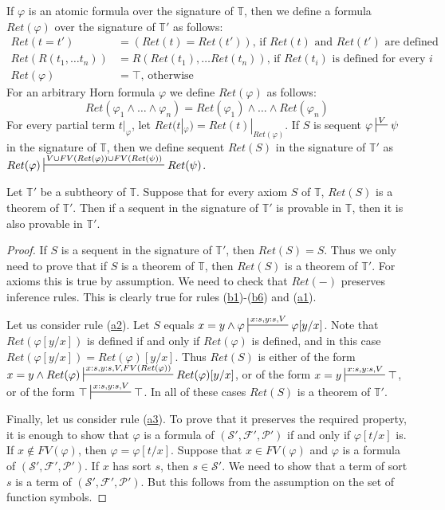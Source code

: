 \documentclass[reqno]{amsart}
\newcommand{\axref}[1]{(\hyperref[ax:#1]{#1})}
\theoremstyle{definition}
\theoremstyle{remark}
\numberwithin{figure}{section}
\begin{document}
If $\varphi$ is an atomic formula over the signature of $\mathbb{T}$, then we define a formula $Ret(\varphi)$ over the signature of $\mathbb{T}'$ as follows:
\begin{align*}
Ret(t = t') & = (Ret(t) = Ret(t')) \text{, if $Ret(t)$ and $Ret(t')$ are defined} \\
Ret(R(t_1, \ldots t_n)) & = R(Ret(t_1), \ldots Ret(t_n)) \text{, if $Ret(t_i)$ is defined for every $i$} \\
Ret(\varphi) & = \top \text{, otherwise}
\end{align*}
For an arbitrary Horn formula $\varphi$ we define $Ret(\varphi)$ as follows:
\[ Ret(\varphi_1 \land \ldots \land \varphi_n) = Ret(\varphi_1) \land \ldots \land Ret(\varphi_n) \]
For every partial term $t|_\varphi$, let $Ret(t|_\varphi) = Ret(t)|_{Ret(\varphi)}$.
If $S$ is sequent $\varphi \sststile{}{V} \psi$ in the signature of $\mathbb{T}$,
    then we define sequent $Ret(S)$ in the signature of $\mathbb{T}'$ as $Ret(\varphi) \sststile{}{V \cup FV(Ret(\varphi)) \cup FV(Ret(\psi))} Ret(\psi)$.

\begin{lem}[subtheory]
Let $\mathbb{T}'$ be a subtheory of $\mathbb{T}$.
Suppose that for every axiom $S$ of $\mathbb{T}$, $Ret(S)$ is a theorem of $\mathbb{T}'$.
Then if a sequent in the signature of $\mathbb{T}'$ is provable in $\mathbb{T}$, then it is also provable in $\mathbb{T}'$.
\end{lem}
\begin{proof}
If $S$ is a sequent in the signature of $\mathbb{T}'$, then $Ret(S) = S$.
Thus we only need to prove that if $S$ is a theorem of $\mathbb{T}$, then $Ret(S)$ is a theorem of $\mathbb{T}'$.
For axioms this is true by assumption.
We need to check that $Ret(-)$ preserves inference rules.
This is clearly true for rules \axref{b1}-\axref{b6} and \axref{a1}.

Let us consider rule \axref{a2}.
Let $S$ equals $x = y \land \varphi \sststile{}{x:s,y:s,V} \varphi[y/x]$.
Note that $Ret(\varphi[y/x])$ is defined if and only if $Ret(\varphi)$ is defined, and in this case $Ret(\varphi[y/x]) = Ret(\varphi)[y/x]$.
Thus $Ret(S)$ is either of the form $x = y \land Ret(\varphi) \sststile{}{x:s,y:s,V,FV(Ret(\varphi))} Ret(\varphi)[y/x]$,
or of the form $x = y \sststile{}{x:s,y:s,V} \top$, or of the form $\top \sststile{}{x:s,y:s,V} \top$.
In all of these cases $Ret(S)$ is a theorem of $\mathbb{T}'$.

Finally, let us consider rule \axref{a3}.
To prove that it preserves the required property, it is enough to show that $\varphi$ is a formula of $(\mathcal{S}',\mathcal{F}',\mathcal{P}')$ if and only if $\varphi[t/x]$ is.
If $x \notin FV(\varphi)$, then $\varphi = \varphi[t/x]$.
Suppose that $x \in FV(\varphi)$ and $\varphi$ is a formula of $(\mathcal{S}',\mathcal{F}',\mathcal{P}')$.
If $x$ has sort $s$, then $s \in \mathcal{S}'$.
We need to show that a term of sort $s$ is a term of $(\mathcal{S}',\mathcal{F}',\mathcal{P}')$.
But this follows from the assumption on the set of function symbols.
\end{proof}
\end{document}
